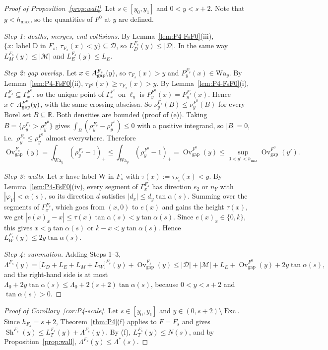 \documentclass[11pt]{amsart}
\newcommand{\R}{\mathbb R}
\newcommand{\cD}{\mathcal D}
\newcommand{\cM}{\mathcal M}
\newcommand{\Sh}{\operatorname{Sh}}
\newcommand{\Ovgap}{\operatorname{Ov}_{\mathrm{gap}}}
\newcommand{\Exc}{\operatorname{Exc}}
\newcommand{\hmax}{h_{\max}}
\newcommand{\Lam}{\Lambda}
\newcommand{\Fz}{F^{0}}
\newcommand{\Fs}{F_{s}}
\theoremstyle{definition}
\theoremstyle{remark}
\numberwithin{equation}{section}
\begin{document}
\begin{proof}[Proof of Proposition~\ref{prop:wall}]
Let $s\in[y_0,y_1]$ and $0<y<s+2$. Note that $y<\hmax$, so the quantities of $\Fz$ at $y$ are defined.

\emph{Step 1: deaths, merges, end collisions.} By Lemma~\ref{lem:P4-FsF0}(iii), $\{x:\ \text{label D in }\Fs,\ \tau_{\Fs}(x)<y\}\subseteq\cD$, so $L^{\Fs}_D(y)\le|\cD|$. In the same way $L^{\Fs}_M(y)\le|\cM|$ and $L^{\Fs}_E(y)\le L_E$.

\emph{Step 2: gap overlap.} Let $x\in A^{\Fs}_{\rm gap}(y)$, so $\tau_{\Fs}(x)>y$ and $P^{\Fs}_y(x)\in\mathrm{Wa}_y$. By Lemma~\ref{lem:P4-FsF0}(ii), $\tau_{\Fz}(x)\ge\tau_{\Fs}(x)>y$. By Lemma~\ref{lem:P4-FsF0}(i), $\Gamma^{\Fs}_x\subseteq\Gamma^{\Fz}_x$, so the unique point of $\Gamma^{\Fz}_x$ on $\ell_y$ is $P^{\Fz}_y(x)=P^{\Fs}_y(x)$. Hence $x\in A^{\Fz}_{\rm gap}(y)$, with the same crossing abscissa. So $\nu^{\Fs}_y(B)\le\nu^{\Fz}_y(B)$ for every Borel set $B\subseteq\R$. Both densities are bounded (proof of (e)). Taking $B=\{\rho^{\Fs}_y>\rho^{\Fz}_y\}$ gives $\int_B(\rho^{\Fs}_y-\rho^{\Fz}_y)\le0$ with a positive integrand, so $|B|=0$, i.e.\ $\rho^{\Fs}_y\le\rho^{\Fz}_y$ almost everywhere. Therefore
\[
\Ovgap^{\Fs}(y)=\int_{\mathrm{Wa}_y}(\rho^{\Fs}_y-1)_+\le\int_{\mathrm{Wa}_y}(\rho^{\Fz}_y-1)_+=\Ovgap^{\Fz}(y)\le\sup_{0<y'<\hmax}\Ovgap^{\Fz}(y').
\]

\emph{Step 3: walls.} Let $x$ have label W in $\Fs$ with $\tau(x):=\tau_{\Fs}(x)<y$. By Lemma~\ref{lem:P4-FsF0}(iv), every segment of $\Gamma^{\Fs}_x$ has direction $e_2$ or $n_Y$ with $|\varphi_Y|<\alpha(s)$, so its direction $d$ satisfies $|d_x|\le d_y\tan\alpha(s)$. Summing over the segments of $\Gamma^{\Fs}_x$, which goes from $(x,0)$ to $e(x)$ and gains the height $\tau(x)$, we get $|e(x)_x-x|\le\tau(x)\tan\alpha(s)<y\tan\alpha(s)$. Since $e(x)_x\in\{0,k\}$, this gives $x<y\tan\alpha(s)$ or $k-x<y\tan\alpha(s)$. Hence $L^{\Fs}_W(y)\le2y\tan\alpha(s)$.

\emph{Step 4: summation.} Adding Steps 1--3,
\[
\Lam^{\Fs}(y)=\big[L_D+L_E+L_M+L_W\big]^{\Fs}(y)+\Ovgap^{\Fs}(y)\le|\cD|+|\cM|+L_E+\Ovgap^{\Fz}(y)+2y\tan\alpha(s),
\]
and the right-hand side is at most $\Lam_0+2y\tan\alpha(s)\le\Lam_0+2(s+2)\tan\alpha(s)$, because $0<y<s+2$ and $\tan\alpha(s)>0$.
\end{proof}

\begin{proof}[Proof of Corollary~\ref{cor:P4-scale}]
Let $s\in[y_0,y_1]$ and $y\in(0,s+2)\setminus\Exc$. Since $h_{\Fs}=s+2$, Theorem~\ref{thm:P4}(f) applies to $F=\Fs$ and gives $\Sh^{\Fs}(y)\le L^{\Fs}_T(y)+\Lam^{\Fs}(y)$. By (f), $L^{\Fs}_T(y)\le N(s)$, and by Proposition~\ref{prop:wall}, $\Lam^{\Fs}(y)\le\Lam^*(s)$.
\end{proof}
\end{document}
